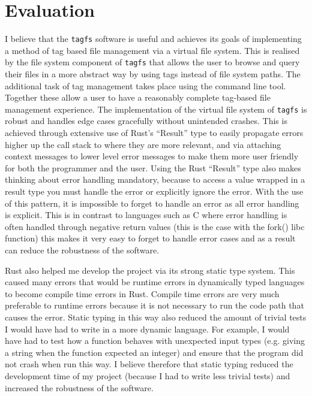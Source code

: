 \chapter{Evaluation}
\label{chap:evaluation}
\vspace{1cm}

I believe that the \texttt{tagfs} software is useful and achieves its goals of
implementing a method of tag based file management via a virtual file system.
This is realised by the file system component of \texttt{tagfs} that allows the
user to browse and query their files in a more abstract way by using tags
instead of file system paths. The additional task of tag management takes place
using the command line tool. Together these allow a user to have a reasonably
complete tag-based file management experience. The implementation of the
virtual file system of \texttt{tagfs} is robust and handles edge cases
gracefully without unintended crashes. This is achieved through extensive use
of Rust's ``Result'' type to easily propagate errors higher up the call stack
to where they are more relevant, and via attaching context messages to lower
level error messages to make them more user friendly for both the programmer
and the user. Using the Rust ``Result'' type also makes thinking about error
handling mandatory, because to access a value wrapped in a result type you must
handle the error or explicitly ignore the error. With the use of this pattern,
it is impossible to forget to handle an error as all error handling is
explicit. This is in contrast to languages such as C where error handling is
often handled through negative return values (this is the case with the fork()
libc function) this makes it very easy to forget to handle error cases and as a
result can reduce the robustness of the software.

Rust also helped me develop the project via its strong static type system. This
caused many errors that would be runtime errors in dynamically typed languages
to become compile time errors in Rust. Compile time errors are very much
preferable to runtime errors because it is not necessary to run the code path
that causes the error. Static typing in this way also reduced the amount of
trivial tests I would have had to write in a more dynamic language. For
example, I would have had to test how a function behaves with unexpected input
types (e.g. giving a string when the function expected an integer) and ensure
that the program did not crash when run this way. I believe therefore that
static typing reduced the development time of my project (because I had to
write less trivial tests) and increased the robustness of the software.

